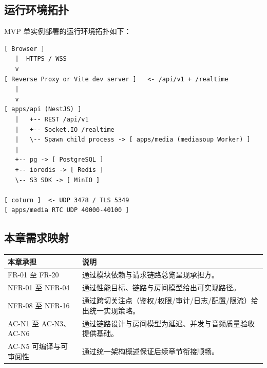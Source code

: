 \subsection{运行环境拓扑}

MVP 单实例部署的运行环境拓扑如下：

\begin{verbatim}
[ Browser ]
   |  HTTPS / WSS
   v
[ Reverse Proxy or Vite dev server ]   <- /api/v1 + /realtime
   |
   v
[ apps/api (NestJS) ]
   |   +-- REST /api/v1
   |   +-- Socket.IO /realtime
   |   \-- Spawn child process -> [ apps/media (mediasoup Worker) ]
   |
   +-- pg -> [ PostgreSQL ]
   +-- ioredis -> [ Redis ]
   \-- S3 SDK -> [ MinIO ]

[ coturn ]  <- UDP 3478 / TLS 5349
[ apps/media RTC UDP 40000-40100 ]
\end{verbatim}

\subsection{本章需求映射}
\noindent\begin{tabularx}{\textwidth}{L{3cm}Y}
  \toprule
  本章承担 & 说明 \\
  \midrule
  FR-01 至 FR-20 & 通过模块依赖与请求链路总览呈现承担方。 \\
  NFR-01 至 NFR-04 & 通过性能目标、链路与房间模型给出可实现路径。 \\
  NFR-08 至 NFR-16 & 通过跨切关注点（鉴权/权限/审计/日志/配置/限流）给出统一实现策略。 \\
  AC-N1 至 AC-N3、AC-N6 & 通过链路设计与房间模型为延迟、并发与音频质量验收提供基础。 \\
  AC-N5 可编译与可审阅性 & 通过统一架构概述保证后续章节衔接顺畅。 \\
  \bottomrule
\end{tabularx}
